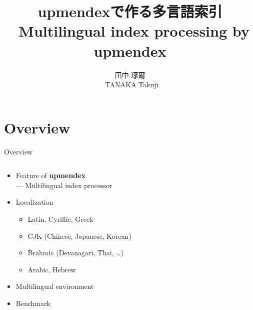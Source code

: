 \documentclass[aspectratio=169,10pt]{beamer}
\title{\textjapanese{upmendexで作る多言語索引}\\
~Multilingual index processing by upmendex}
\author{田中 琢爾\\~TANAKA Takuji}
\begin{document}

\begin{japanese}
\frame{\titlepage}
\end{japanese}

\section{Overview}
\begin{frame}{Overview}

\begin{columns}
\begin{column}{65mm}

  \begin{itemize}
  \item Feature of \textbf{upmendex}\\
     --- Multilingual index processor
  \item Localization
     \begin{itemize}
      \item Latin, Cyrillic, Greek
      \item CJK (Chinese, Japanese, Korean)
      \item Brahmic (Devanagari, Thai, \ldots)
      \item Arabic, Hebrew
     \end{itemize}
  \item Multilingual environment
  \item Benchmark
  \end{itemize}
\end{column}

\begin{column}{65mm}

\begin{center}
\end{center}
\end{column}
\end{columns}

\end{frame}
\end{document}
